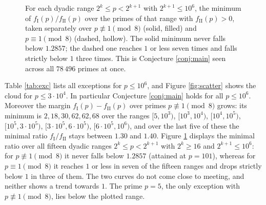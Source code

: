 \documentclass[11pt,reqno]{amsart}
\theoremstyle{plain}
\theoremstyle{definition}
\numberwithin{equation}{section}
\newcommand{\fI}{f_{\mathrm{I}}}
\newcommand{\fII}{f_{\mathrm{II}}}
\begin{document}
\begin{figure}[t]
\caption{For each dyadic range $2^{k}\le p<2^{k+1}$ with $2^{k+1}\le10^{6}$, the
minimum of $\fI(p)/\fII(p)$ over the primes of that range with $\fII(p)>0$, taken
separately over $p\not\equiv1\pmod8$ (solid, filled) and $p\equiv1\pmod8$ (dashed,
hollow). The solid minimum never falls below $1.2857$; the dashed one reaches $1$ or
less seven times and falls strictly below $1$ three times. This is Conjecture
\ref{conj:main} seen across all $78\,496$ primes at once.}
\label{fig:minratio}
\end{figure}

Table \ref{tab:exc} lists all exceptions for $p\le10^{6}$, and Figure
\ref{fig:scatter} shows the cloud for $p\le3\cdot10^{4}$. In particular Conjecture
\ref{conj:main} holds for all $p\le10^{6}$. Moreover the margin $\fI(p)-\fII(p)$ over
primes $p\not\equiv1\pmod8$ grows: its minimum is $2,18,30,62,62,68$ over the ranges
$[5,10^{3})$, $[10^{3},10^{4})$, $[10^{4},10^{5})$, $[10^{5},3\cdot10^{5})$,
$[3\cdot10^{5},6\cdot10^{5})$, $[6\cdot10^{5},10^{6})$, and over the last five of these
the minimal ratio $\fI/\fII$ stays between $1.30$ and $1.40$. Figure
\ref{fig:minratio} displays the minimal ratio over all fifteen dyadic ranges
$2^{k}\le p<2^{k+1}$ with $2^{k}\ge16$ and $2^{k+1}\le10^{6}$: for
$p\not\equiv1\pmod8$ it never falls below $1.2857$ (attained at $p=101$), whereas for
$p\equiv1\pmod 8$ it reaches $1$ or less in seven of the fifteen ranges and drops
strictly below $1$ in three of them. The two curves do not come close to meeting, and
neither shows a trend towards $1$. The prime $p=5$, the only exception with
$p\not\equiv1\pmod8$, lies below the plotted range.
\end{document}
